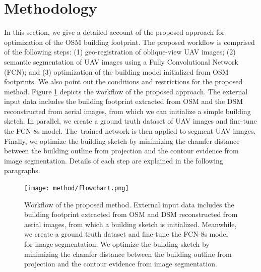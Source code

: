 
\section{Methodology}\label{sec:method}
In this section, we give a detailed account of the proposed approach for optimization of the OSM building footprint. The proposed workflow is comprised of the following steps: (1) geo-registration of oblique-view UAV images; (2) semantic segmentation of UAV images using a Fully Convolutional Network (FCN); and (3) optimization of the building model initialized from OSM footprints. We also point out the conditions and restrictions for the proposed method. Figure \ref{fig:flow} depicts the workflow of the proposed approach. The external input data includes the building footprint extracted from OSM and the DSM reconstructed from aerial images, from which we can initialize a simple building sketch. In parallel, we create a ground truth dataset of UAV images and fine-tune the FCN-8s model. The~trained network is then applied to segment UAV images. Finally, we optimize the building sketch by minimizing the chamfer distance between the building outline from projection and the contour evidence from image segmentation. Details of each step are explained in the following paragraphs. 

\begin{figure}[H]
    \centering       
           \centering
           \texttt{[image: method/flowchart.png]} 
       \caption{Workflow of the proposed method. External input data includes the building footprint extracted from OSM and DSM 
reconstructed from aerial images, from which a building sketch is initialized. Meanwhile, we create a ground truth dataset and fine-tune the FCN-8s 
model for image segmentation. We optimize the building sketch by minimizing the chamfer distance between the building outline from projection and the contour evidence from image segmentation.}
       \label{fig:flow}
\end{figure}


